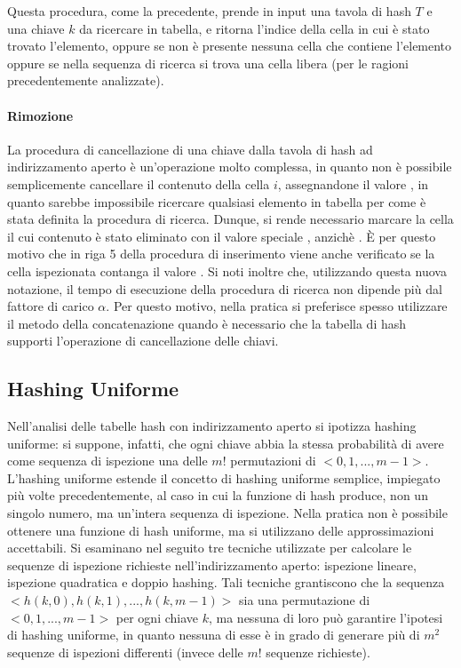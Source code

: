 

Questa procedura, come la precedente, prende in input una tavola di hash \(T\) e una chiave \(k\) da ricercare in tabella, e ritorna l'indice della cella in cui è stato trovato l'elemento, oppure  se non è presente nessuna cella che contiene l'elemento oppure se nella sequenza di ricerca si trova una cella libera (per le ragioni precedentemente analizzate).

\paragraph{Rimozione}
La procedura di cancellazione di una chiave dalla tavola di hash ad indirizzamento aperto è un'operazione molto complessa, in quanto non è possibile semplicemente cancellare il contenuto della cella \(i\), assegnandone il valore , in quanto sarebbe impossibile ricercare qualsiasi elemento in tabella per come è stata definita la procedura di ricerca. Dunque, si rende necessario marcare la cella il cui contenuto è stato eliminato con il valore speciale , anzichè . È per questo motivo che in riga 5 della procedura di inserimento viene anche verificato se la cella ispezionata contanga il valore . Si noti inoltre che, utilizzando questa nuova notazione, il tempo di esecuzione della procedura di ricerca non dipende più dal fattore di carico \(\alpha\). Per questo motivo, nella pratica si preferisce spesso utilizzare il metodo della concatenazione quando è necessario che la tabella di hash supporti l'operazione di cancellazione delle chiavi. 

\subsection{Hashing Uniforme}
Nell'analisi delle tabelle hash con indirizzamento aperto si ipotizza hashing uniforme: si suppone, infatti, che ogni chiave abbia la stessa probabilità di avere come sequenza di ispezione una delle \(m!\) permutazioni di \(<0,1,...,m-1>\). L'hashing uniforme estende il concetto di hashing uniforme semplice, impiegato più volte precedentemente, al caso in cui la funzione di hash produce, non un singolo numero, ma un'intera sequenza di ispezione. Nella pratica non è possibile ottenere una funzione di hash uniforme, ma si utilizzano delle approssimazioni accettabili. Si esaminano nel seguito tre tecniche utilizzate per calcolare le sequenze di ispezione richieste nell'indirizzamento aperto: ispezione lineare, ispezione quadratica e doppio hashing. Tali tecniche grantiscono che la sequenza \(<h(k,0), h(k,1),..., h(k,m-1)>\) sia una permutazione di \(<0,1,...,m-1>\) per ogni chiave \(k\), ma nessuna di loro può garantire l'ipotesi di hashing uniforme, in quanto nessuna di esse è in grado di generare più di \(m^2\) sequenze di ispezioni differenti (invece delle \(m!\) sequenze richieste). 


